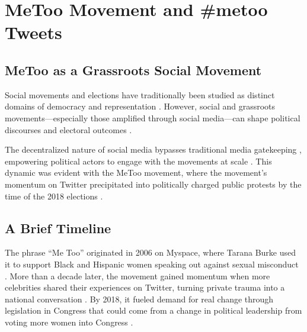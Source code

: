 \documentclass[manuscript,screen,nonacm,11pt,acm]{acmart}
\begin{document}
\section{MeToo Movement and \#metoo Tweets}
\label{sec:background}
\subsection{MeToo as a Grassroots Social Movement}
\label{sec:mt-background}
Social movements and elections have traditionally been studied as distinct domains of democracy and representation \citep{McAdam_Tarrow_2010}.
However, social and grassroots movements---especially those amplified through social media---can shape political discourses and electoral outcomes \citep{Amenta2010, Gibson2019, elitestweet, thomsen2020, womenmarch, kim2022, leon2022, cs, weiss2022, sobolev2020, Acemoglu2018, Eisele2022}.

The decentralized nature of social media bypasses traditional media gatekeeping \citep[e.g.,][]{AEP2015, Boas2011, Enikolopov2011}, empowering political actors to engage with the movements at scale \citep{elitestweet, cs, womenmarch, dittmar2020}.
This dynamic was evident with the MeToo movement, where the movement's momentum on Twitter precipitated into politically charged public protests by the time of the 2018 elections \citep{Eisele2022, dittmar2020, Gibson2019, womenmarch, thomsen2020, DeMora2023}.

\subsection{A Brief Timeline}
\label{sec:mt-timeline}
The phrase ``Me Too'' originated in 2006 on Myspace, where Tarana Burke used it to support Black and Hispanic women speaking out against sexual misconduct \citep{Eisele2022, Gibson2019}.
More than a decade later, the movement gained momentum when more celebrities shared their experiences on Twitter, turning private trauma into a national conversation \citep{goenaga2021}. 
By 2018, it fueled demand for real change through legislation in Congress that could come from a change in political leadership from voting more women into Congress \citep{genderwatch2018, telegraphMetoo, tippett2018-bi,thomsen2020, nyt2018}. 
\end{document}

